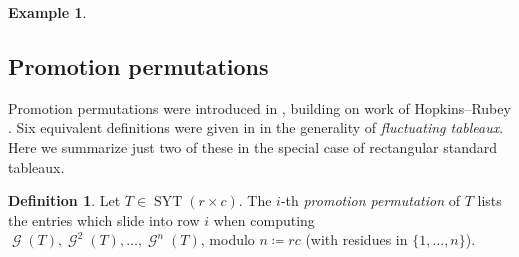 \documentclass{amsart}
\theoremstyle{definition}
\newtheorem{definition}[theorem]{Definition}
\newtheorem{example}[theorem]{Example}
\DeclareMathOperator{\SYT}{SYT}
\DeclareMathOperator{\gromotion}{\mathcal{G}}
\DeclareMathOperator{\promotion}{\mathcal{P}}
\DeclareMathOperator{\evacuation}{\mathcal{E}}
\begin{document}
\begin{example}
    \newsavebox{\exPEGf}
    
    \begin{center}
    \end{center}
\end{example}

\subsection{Promotion permutations}\label{sec:background-prom-perms}
Promotion permutations were introduced in \cite{fluctuating-paper}, building on work of Hopkins--Rubey \cite{Hopkins-Rubey}. Six equivalent definitions were given in \cite{fluctuating-paper} in the generality of \emph{fluctuating tableaux}. Here we summarize just two of these in the special case of rectangular standard tableaux.

\begin{definition}\label{def:prom-perms}
    Let $T \in \SYT(r \times c)$. The $i$-th \emph{promotion permutation} of $T$ lists the entries which slide into row $i$ when computing $\gromotion(T), \gromotion^2(T), \ldots, \gromotion^n(T)$, modulo $n \coloneqq rc$ (with residues in $\{1, \ldots, n\}$).
\end{definition}
\end{document}
